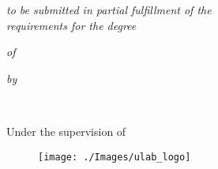\thispagestyle{empty}
\begin{center}
    { \Large {\bfseries {\ReportTitle}} \par}
\vspace{3\baselineskip}
    {\textit{\RoportType to be submitted in partial fulfillment of the}\\
    \textit{requirements for the degree}}\par
\vspace{\baselineskip}
    {\textit{of} \par}
\vspace{\baselineskip}
    {\large \bf \Degree \par} 
\vspace{\baselineskip}
    {\textit{by} \par}
\vspace{\baselineskip}
    {{\large {\bf \firstAuthor \\ \firstAuthorID}} \par}
\vspace{1.5\baselineskip}
    {Under the supervision of \par}
\vspace{\baselineskip}
    {{\large \bf \Supervisor} \par}
\vspace{1.5\baselineskip}
    {\begin{figure}[!h] 
	\centering
	\texttt{[image: ./Images/ulab\_logo]} 
     \end{figure}
    }
\vspace{1.5\baselineskip}
    {\bf \MakeUppercase{\Department} \par}
\vspace*{1ex}
    {\bf \MakeUppercase{\University} \par}
\vspace*{5ex}
    {\bf \MakeUppercase{\reportSubmissionTerm} \par}    
    
 \end{center}